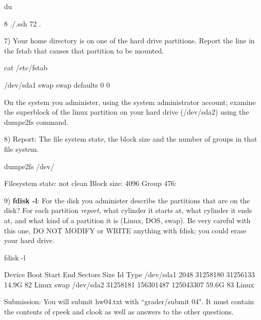 du

8	./.ssh
72	.


7) Your home directory is on one of the hard drive partitions.
Report the line in the {\ltt{}fstab} that causes that partition
to be mounted.

cat /etc/fstab

/dev/sda1        swap             swap        defaults         0   0

On the system you administer, using the system administrator account;
examine the superblock of the linux partition on your hard drive
({\ltt{}/dev/sda2}) using the {\ltt{}dumpe2fs} command.

8) Report: The file system state, the block size and the number of groups
in that file system.

dumpe2fs /dev/

Filesystem state:         not clean
Block size:               4096
Group 476:

9) {\bf fdisk -l}:
For the disk you administer describe the partitions that are on the disk?
For each partition {\it report}, what cylinder it starts at,
what cylinder it ends at,
and what kind of a partition it is (Linux, DOS, swap).
Be very careful with this one, 
DO NOT MODIFY or WRITE anything with fdisk; 
you could erase your hard drive.

fdisk -l

Device     Boot    Start       End   Sectors  Size Id Type
/dev/sda1           2048  31258180  31256133 14.9G 82 Linux swap
/dev/sda2       31258181 156301487 125043307 59.6G 83 Linux

Submission: You will submit hw04.txt with ``\tilde grader/submit 04". 
It must contain the contents of cpeek and clook as well as answers to 
the other questions.

\bye

